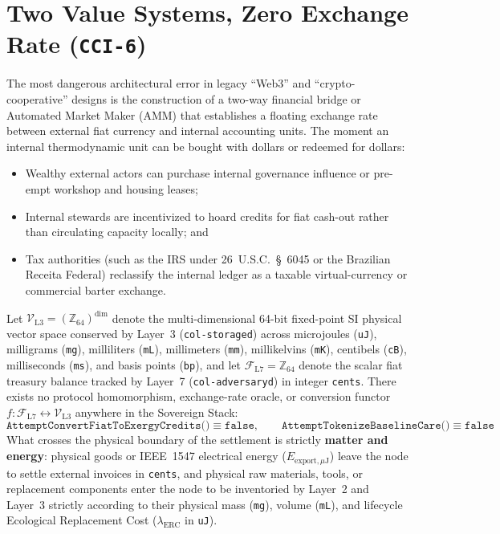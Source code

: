 \section{Two Value Systems, Zero Exchange Rate (\texttt{CCI-6})}
\label{sec:l7-value-incommensurability}

The most dangerous architectural error in legacy ``Web3'' and ``crypto-cooperative'' designs is the construction of a two-way financial bridge or Automated Market Maker (AMM) that establishes a floating exchange rate between external fiat currency and internal accounting units. The moment an internal thermodynamic unit can be bought with dollars or redeemed for dollars:
\begin{itemize}
    \item Wealthy external actors can purchase internal governance influence or pre-empt workshop and housing leases;
    \item Internal stewards are incentivized to hoard credits for fiat cash-out rather than circulating capacity locally; and
    \item Tax authorities (such as the IRS under 26~U.S.C.~\S~6045 or the Brazilian Receita Federal) reclassify the internal ledger as a taxable virtual-currency or commercial barter exchange.
\end{itemize}

\begin{theorem}
\label{thm:l7-incommensurability}
Let $\mathcal{V}_{\mathrm{L3}} = (\mathbb{Z}_{64})^{\text{dim}}$ denote the multi-dimensional 64-bit fixed-point SI physical vector space conserved by Layer~3 (\texttt{col-storaged}) across microjoules (\texttt{uJ}), milligrams (\texttt{mg}), milliliters (\texttt{mL}), millimeters (\texttt{mm}), millikelvins (\texttt{mK}), centibels (\texttt{cB}), milliseconds (\texttt{ms}), and basis points (\texttt{bp}), and let $\mathcal{F}_{\mathrm{L7}} = \mathbb{Z}_{64}$ denote the scalar fiat treasury balance tracked by Layer~7 (\texttt{col-adversaryd}) in integer \texttt{cents}. There exists no protocol homomorphism, exchange-rate oracle, or conversion functor $f : \mathcal{F}_{\mathrm{L7}} \leftrightarrow \mathcal{V}_{\mathrm{L3}}$ anywhere in the Sovereign Stack:
\begin{equation}
\texttt{AttemptConvertFiatToExergyCredits()} \equiv \texttt{false}, \qquad \texttt{AttemptTokenizeBaselineCare()} \equiv \texttt{false}
\label{eq:ch1-no-exchange-rate}
\end{equation}
What crosses the physical boundary of the settlement is strictly \textbf{matter and energy}: physical goods or IEEE~1547 electrical energy ($E_{\mathrm{export},\mu\mathrm{J}}$) leave the node to settle external invoices in \texttt{cents}, and physical raw materials, tools, or replacement components enter the node to be inventoried by Layer~2 and Layer~3 strictly according to their physical mass (\texttt{mg}), volume (\texttt{mL}), and lifecycle Ecological Replacement Cost ($\lambda_{\mathrm{ERC}}$ in \texttt{uJ}).
\end{theorem}

